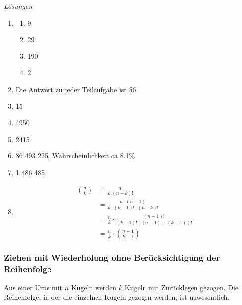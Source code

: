 \clearpage
\emph{Lösungen}
\begin{enumerate}
    \item \begin{enumerate}
              \item 9
              \item 29
              \item 190
              \item 2
          \end{enumerate}
    \item Die Antwort zu jeder Teilaufgabe ist 56
    \item 15
    \item 4950
    \item 2415
    \item 86 493 225, Wahrscheinlichkeit ca 8.1\%
    \item 1 486 485
    \item  \begin{align*}
              \binom{n}{k} & = \frac{n!}{k!(n-k)!}                                   \\
                           & = \frac{n \cdot (n-1)!}{k \cdot (k-1)! \cdot (n-k)!}    \\
                           & = \frac{n}{k} \cdot \frac{(n-1)!}{(k-1)!((n-1)-(k-1))!} \\
                           & = \frac{n}{k} \cdot \binom{n-1}{k-1}
          \end{align*}
\end{enumerate}















\clearpage
\subsubsection{Ziehen mit Wiederholung ohne Berücksichtigung der Reihenfolge }

Aus einer Urne mit \(n\) Kugeln werden \(k\) Kugeln mit Zurücklegen gezogen. Die Reihenfolge, in der die einzelnen Kugeln gezogen werden, ist unwesentlich.


